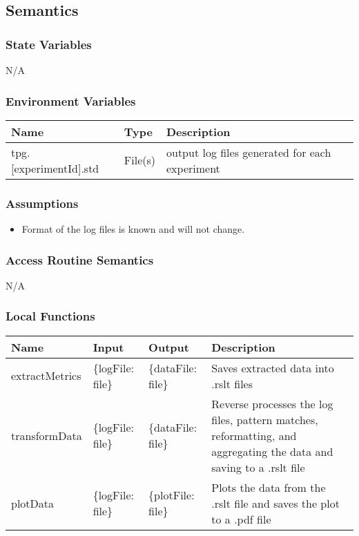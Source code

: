 \documentclass[12pt, titlepage]{article}
\begin{document}
\subsection{Semantics}

\subsubsection{State Variables}
N/A

\subsubsection{Environment Variables}

  \begin{center}
    \begin{tabular}{p{4cm} p{4cm} p{4cm}}
    \hline
    \textbf{Name} & \textbf{Type} & \textbf{Description} \\
    \hline
    tpg.[experimentId].std & File(s) & output log files generated for each experiment \\
    \hline
    \end{tabular}
    \end{center}

\subsubsection{Assumptions}

\begin{itemize}
  \item Format of the log files is known and will not change.
\end{itemize}
\subsubsection{Access Routine Semantics}

N/A

\subsubsection{Local Functions}

\begin{center}
  \begin{tabular}{p{3cm} p{3cm} p{3cm} p{4cm}}
  \hline
  \textbf{Name} & \textbf{Input} & \textbf{Output} & \textbf{Description} \\
  \hline
  extractMetrics & \{logFile: file\} & \{dataFile: file\} & Saves extracted data into .rslt files \\
  \hline
  transformData & \{logFile: file\} & \{dataFile: file\} & Reverse processes the log files, pattern matches, reformatting, and aggregating the data and saving to a .rslt file \\
  \hline
  plotData & \{logFile: file\} & \{plotFile: file\} & Plots the data from the .rslt file and saves the plot to a .pdf file \\
  \end{tabular}
\end{center}
\end{document}
